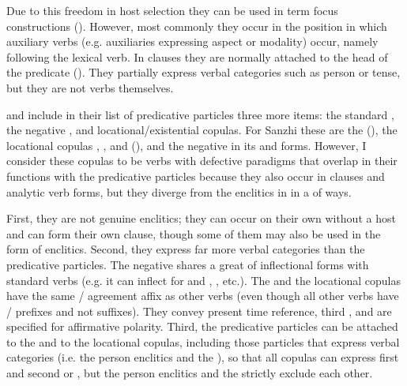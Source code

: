 Due to this freedom in host selection they can be used in term focus constructions (). However, most commonly they occur in the position in which auxiliary verbs (e.g. auxiliaries expressing aspect or modality) occur, namely following the lexical verb. In  clauses they are normally attached to the head of the predicate (). They partially express verbal categories such as person or tense, but they are not verbs themselves.

\citet[138]{Sumbatova.Mutalov2003} and \citet[153]{Sumbatova.Lander2014} include in their list of predicative particles three more items: the standard , the negative , and locational/existential copulas. For Sanzhi these are the   (), the locational copulas , ,  and  (), and the negative   in its  and  forms. However, I consider these copulas to be verbs with defective paradigms that overlap in their functions with the predicative particles because they also occur in  clauses and analytic verb forms, but they diverge from the enclitics in  in a  of ways.

First, they are not genuine enclitics; they can occur on their own without a host and can form their own clause, though some of them may also be used in the form of enclitics. Second, they express far more verbal categories than the predicative particles. The negative  shares a great  of inflectional forms with standard verbs (e.g. it can inflect for  and , , etc.). The  and the locational copulas have the same / agreement affix as other verbs (even though all other verbs have / prefixes and not suffixes). They convey present time reference, third , and are specified for affirmative polarity. Third, the predicative particles can be attached to the  and to the locational copulas, including those particles that express verbal categories (i.e. the person enclitics and the  ), so that all copulas can express first and second  or  , but the person enclitics and the   strictly exclude each other.

